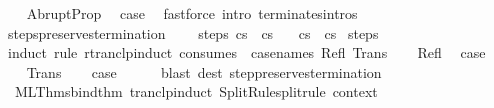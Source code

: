 \begin{isabellebody}
\isamarkupfalse%
\isanewline
\ \ \isamarkupfalse%
\ AbruptProp\ \isamarkupfalse%
\ {\isacharquery}case\ \isamarkupfalse%
\ {\isacharparenleft}fastforce\ intro{\isacharcolon}\ terminates{\isachardot}intros{\isacharparenright}\isanewline
{}\isamarkupfalse%
%
\endisatagproof
{\isafoldproof}%
%
\isadelimproof
\isanewline
%
\endisadelimproof
\isanewline
{}\isamarkupfalse%
\ steps{\isacharunderscore}preserves{\isacharunderscore}termination{\isacharcolon}\ \isanewline
\ \ \ steps{\isacharcolon}\ {\isachardoublequoteopen}{\isasymGamma}{\isasymturnstile}{\isacharparenleft}c{\isacharcomma}s{\isacharparenright}\ {\isasymrightarrow}\isactrlsup {\isacharasterisk}\ {\isacharparenleft}c{\isacharprime}{\isacharcomma}s{\isacharprime}{\isacharparenright}{\isachardoublequoteclose}\isanewline
\ \ \ {\isachardoublequoteopen}{\isasymGamma}{\isasymturnstile}c{\isasymdown}s\ {\isasymLongrightarrow}\ {\isasymGamma}{\isasymturnstile}c{\isacharprime}{\isasymdown}s{\isacharprime}{\isachardoublequoteclose}\isanewline
%
\isadelimproof
%
\endisadelimproof
%
\isatagproof
{}\isamarkupfalse%
\ steps\isanewline
{}\isamarkupfalse%
\ {\isacharparenleft}induct\ rule{\isacharcolon}\ rtranclp{\isacharunderscore}induct{}\ {\isacharbrackleft}consumes\ {}{\isacharcomma}\ case{\isacharunderscore}names\ Refl\ Trans{\isacharbrackright}{\isacharparenright}\isanewline
\ \ \isamarkupfalse%
\ Refl\ \isamarkupfalse%
\ {\isacharquery}case\ \ \isacommand{{\isachardot}}\isamarkupfalse%
\isanewline
{}\isamarkupfalse%
\isanewline
\ \ \isamarkupfalse%
\ Trans\isanewline
\ \ \isamarkupfalse%
\ {\isacharquery}case\isanewline
\ \ \ \ \isamarkupfalse%
\ {\isacharparenleft}blast\ dest{\isacharcolon}\ step{\isacharunderscore}preserves{\isacharunderscore}termination{\isacharparenright}\isanewline
{}\isamarkupfalse%
%
\endisatagproof
{\isafoldproof}%
%
\isadelimproof
\isanewline
%
\endisadelimproof
%
\isadelimML
\isanewline
%
\endisadelimML
%
\isatagML
{}\isamarkupfalse%
\ {\isacartoucheopen}\isanewline
\ \ ML{\isacharunderscore}Thms{\isachardot}bind{\isacharunderscore}thm\ {\isacharparenleft}{\isachardoublequote}tranclp{\isacharunderscore}induct{}{\isachardoublequote}{\isacharcomma}\ Split{\isacharunderscore}Rule{\isachardot}split{\isacharunderscore}rule\ {\isacharat}{\isacharbraceleft}context{\isacharbraceright}\isanewline

\end{isabellebody}
